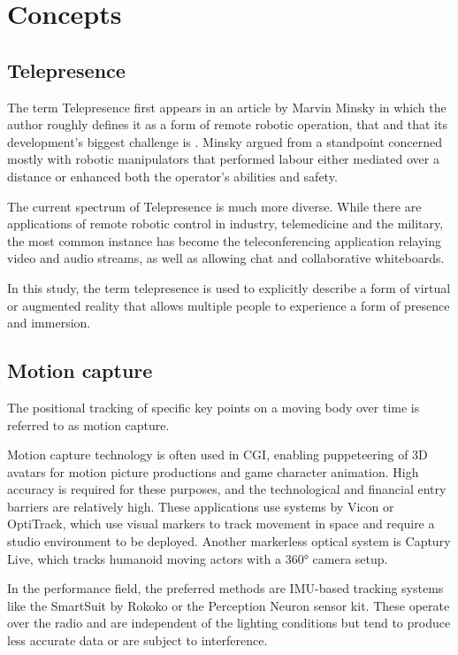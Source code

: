 \chapter{Concepts}
\label{chapter:concepts}

\section{Telepresence}

The term Telepresence first appears in an article by Marvin Minsky in which the author roughly defines it as a form of remote robotic operation, that  and that its development's biggest challenge is  \parencite{minskyTelepresence}. Minsky argued from a standpoint concerned mostly with robotic manipulators that performed labour either mediated over a distance or enhanced both the operator's abilities and safety.

The current spectrum of Telepresence is much more diverse. While there are applications of remote robotic control in industry, telemedicine and the military, the most common instance has become the teleconferencing application relaying video and audio streams, as well as allowing chat and collaborative whiteboards.

In this study, the term telepresence is used to explicitly describe a form of virtual or augmented reality that allows multiple people to experience a form of presence and immersion.

\section{Motion capture}

The positional tracking of specific key points on a moving body over time is referred to as motion capture.

Motion capture technology is often used in CGI, enabling puppeteering of 3D avatars for motion picture productions and game character animation. High accuracy is required for these purposes, and the technological and financial entry barriers are relatively high. These applications use systems by Vicon or OptiTrack, which use visual markers to track movement in space and require a studio environment to be deployed. Another markerless optical system is Captury Live, which tracks humanoid moving actors with a 360° camera setup.

In the performance field, the preferred methods are IMU-based tracking systems like the SmartSuit by Rokoko or the Perception Neuron sensor kit. These operate over the radio and are independent of the lighting conditions but tend to produce less accurate data or are subject to interference.


